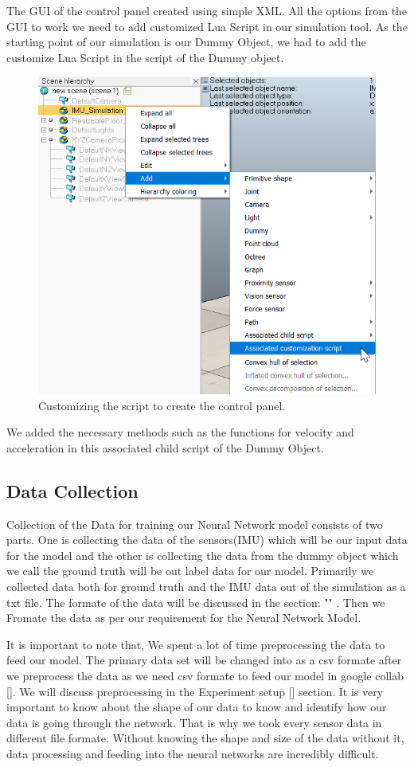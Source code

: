 The GUI of the control panel created using simple XML. All the options from the GUI to work we need to add customized Lua Script in our simulation tool. As the starting point of our simulation is our Dummy Object, we had to add the customize Lua Script in the script of the Dummy object.

\begin{figure}[h]
  \centering
    \includegraphics[width=0.6\linewidth]{figures/assoChildScript.png}
    \caption{Customizing the script to create the control panel.}
\label{fig:assoCS}
\end{figure}

We added the necessary methods such as the functions for velocity and acceleration in this associated child script of the Dummy Object.


\subsection{Data Collection}
Collection of the Data for training our Neural Network model consists of two parts. One is collecting the data of the sensors(IMU) which will be our input data for the model and the other is collecting the data from the dummy object which we call the ground truth will be out label data for our model.
Primarily we collected data both for ground truth and the IMU data out of the simulation as a txt file. The formate of the data will be discussed in the section: "" . Then we Fromate the data as per our requirement for the Neural Network Model.

It is important to note that, We spent a lot of time preprocessing the data to feed our model. The primary data set will be changed into as a csv formate after we preprocess the data as we need csv formate to feed our model in google collab []. We will discuss preprocessing in the Experiment setup [] section. It is very important to know about the shape of our data to know and identify how our data is going through the network. That is why we took every sensor data in different file formate. Without knowing the shape and size of the data without it, data processing and feeding into the neural networks are incredibly difficult.

